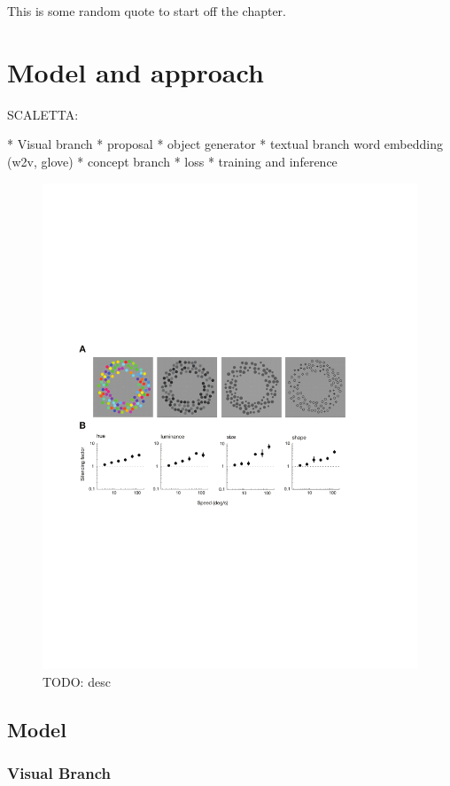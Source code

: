 \begin{savequote}[75mm]
This is some random quote to start off the chapter.
\end{savequote}

\chapter{Model and approach}


SCALETTA:

* Visual branch
  * proposal 
  * object generator
* textual branch
  word embedding (w2v, glove)
* concept branch
* loss
* training and inference

\begin{figure}
  \centering
  \includegraphics[width=.6\textwidth]{figures/fig1.pdf}
  \caption[TODO]{TODO: desc}
  \label{fig:model-architecture}
\end{figure}

\section{Model}

\subsection{Visual Branch}

